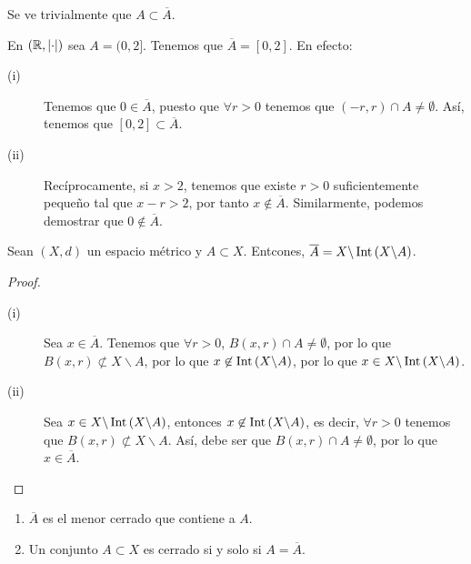 \begin{observation}
Se ve trivialmente que $\displaystyle A \subset \overline{A} $.
\end{observation}
\begin{eg}
	En $\displaystyle \left(\mathbb{R}, \left| \cdot \right|\right) $ sea $\displaystyle A = (0,2] $. Tenemos que $\displaystyle \overline{A} = \left[0,2\right]  $. En efecto:
	\begin{description}
	\item[(i)] Tenemos que $\displaystyle 0 \in \overline{A} $, puesto que $\displaystyle \forall r > 0 $ tenemos que $\displaystyle \left(-r,r\right) \cap A \neq \emptyset $. Así, tenemos que $\displaystyle \left[0,2\right] \subset \overline{A} $.
	\item[(ii)] Recíprocamente, si $\displaystyle x > 2 $, tenemos que existe $\displaystyle r > 0 $ suficientemente pequeño tal que $\displaystyle x - r > 2 $, por tanto $\displaystyle x \not\in \overline{A} $. Similarmente, podemos demostrar que $\displaystyle 0 \not\in \overline{A} $.
	\end{description}
\end{eg}
\begin{lema}
Sean $\displaystyle \left(X,d\right) $ un espacio métrico y $\displaystyle A \subset X $. Entcones, $\displaystyle \overline{A} = X\backslash\operatorname{Int}\left(X\backslash A\right) $.
\end{lema}
\begin{proof}
\begin{description}
\item[(i)] Sea $\displaystyle x \in \overline{A} $. Tenemos que $\displaystyle \forall r > 0 $, $\displaystyle B\left(x,r\right) \cap A \neq \emptyset $, por lo que $\displaystyle B\left(x,r\right) \not \subset X\backslash A $, por lo que $\displaystyle x \not\in \operatorname{Int}\left(X\backslash A\right) $, por lo que $\displaystyle x \in X\backslash\operatorname{Int}\left(X\backslash A\right) $.
\item[(ii)] Sea $\displaystyle x \in X\backslash\operatorname{Int}\left(X\backslash A\right) $, entonces $\displaystyle x \not\in \operatorname{Int}\left(X\backslash A\right) $, es decir, $\displaystyle \forall r > 0 $ tenemos que $\displaystyle B\left(x,r\right) \not \subset X\backslash A $. Así, debe ser que $\displaystyle B\left(x,r\right) \cap A \neq \emptyset $, por lo que $\displaystyle x \in \overline{A} $.
\end{description}
\end{proof}
\begin{prop}
\begin{enumerate}
\item $\displaystyle \overline{A} $ es el menor cerrado que contiene a $\displaystyle A $.
\item Un conjunto $\displaystyle A \subset X $ es cerrado si y solo si $\displaystyle A = \overline{A} $.
\end{enumerate}
\end{prop}
